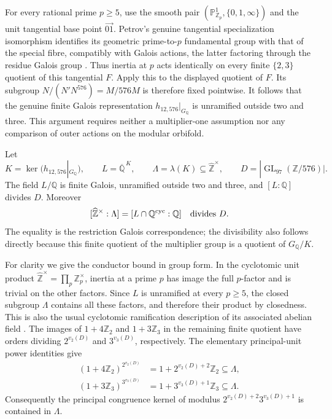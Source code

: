 For every rational prime $p\geq5$, use the smooth pair
$(\mathbb P^1_{\mathbb Z_p},\{0,1,\infty\})$ and the
unit tangential base point $\overrightarrow{01}$.
Petrov's genuine tangential specialization isomorphism
identifies its geometric prime-to-$p$ fundamental group with
that of the special fibre, compatibly with Galois actions,
the latter factoring through the residue Galois group
\cite[Lemma~8.7]{LiftPetrov2023}.
Thus inertia at $p$ acts identically on every finite
$\{2,3\}$ quotient of this tangential $F$. Apply this to
the displayed quotient of $F$. Its subgroup
$N/(N'N^{576})=M/576M$ is therefore fixed pointwise.
It follows that the genuine finite Galois representation
$h_{12,576}|_{G_{\mathbb Q}}$ is unramified outside two
and three. This argument requires neither a multiplier-one
assumption nor any comparison of outer actions on the
modular orbifold.

Let
\[
 K=\ker(h_{12,576}|_{G_{\mathbb Q}}),\qquad
 L=\overline{\mathbb Q}^{\,K},\qquad
 \Lambda=\lambda(K)\subseteq\widehat{\mathbb Z}^{\times},
 \qquad D=|\operatorname{GL}_{97}(\mathbb Z/576)|.
\]
The field $L/\mathbb Q$ is finite Galois, unramified outside
two and three, and $[L:\mathbb Q]$ divides $D$.
Moreover
\[
 [\widehat{\mathbb Z}^{\times}:\Lambda]
       =[L\cap\mathbb Q^{\rm cyc}:\mathbb Q]
       \quad\hbox{divides }D.
\]
The equality is the restriction Galois correspondence; the
divisibility also follows directly because this finite
quotient of the multiplier group is a quotient of
$G_{\mathbb Q}/K$.

For clarity we give the conductor bound in group form.
In the cyclotomic unit product
$\widehat{\mathbb Z}^{\times}=\prod_p\mathbb Z_p^{\times}$,
inertia at a prime $p$ has image the full $p$-factor and
is trivial on the other factors. Since $L$ is unramified
at every $p\geq5$, the closed subgroup $\Lambda$ contains
all these factors, and therefore their product by closedness.
This is also the usual cyclotomic
ramification description of its associated abelian field
\cite[Chapter~I, Theorem~4.16 and its proof]{LiftMilneCFT2020}.
The images of $1+4\mathbb Z_2$ and $1+3\mathbb Z_3$ in
the remaining finite quotient have orders dividing
$2^{v_2(D)}$ and $3^{v_3(D)}$, respectively. The elementary
principal-unit power identities give
\[
 \begin{split}
 (1+4\mathbb Z_2)^{2^{v_2(D)}}
       &=1+2^{v_2(D)+2}\mathbb Z_2\subseteq\Lambda,\\
 (1+3\mathbb Z_3)^{3^{v_3(D)}}
       &=1+3^{v_3(D)+1}\mathbb Z_3\subseteq\Lambda.
 \end{split}
\]
Consequently the principal congruence kernel of modulus
$2^{v_2(D)+2}3^{v_3(D)+1}$ is contained in $\Lambda$.


